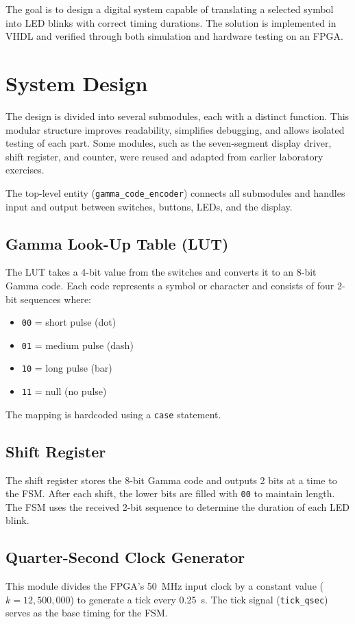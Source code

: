 \documentclass[conference]{IEEEtran}
\begin{document}
The goal is to design a digital system capable of translating a selected symbol into LED blinks with correct timing durations. The solution is implemented in VHDL and verified through both simulation and hardware testing on an FPGA.

\section{System Design}
The design is divided into several submodules, each with a distinct function. This modular structure improves readability, simplifies debugging, and allows isolated testing of each part. Some modules, such as the seven-segment display driver, shift register, and counter, were reused and adapted from earlier laboratory exercises.

The top-level entity (\texttt{gamma\_code\_encoder}) connects all submodules and handles input and output between switches, buttons, LEDs, and the display.

\subsection{Gamma Look-Up Table (LUT)}
The LUT takes a 4-bit value from the switches and converts it to an 8-bit Gamma code. Each code represents a symbol or character and consists of four 2-bit sequences where:
\begin{itemize}
    \item \texttt{00} = short pulse (dot)
    \item \texttt{01} = medium pulse (dash)
    \item \texttt{10} = long pulse (bar)
    \item \texttt{11} = null (no pulse)
\end{itemize}
The mapping is hardcoded using a \texttt{case} statement.

\subsection{Shift Register}
The shift register stores the 8-bit Gamma code and outputs 2 bits at a time to the FSM. After each shift, the lower bits are filled with \texttt{00} to maintain length. The FSM uses the received 2-bit sequence to determine the duration of each LED blink.

\subsection{Quarter-Second Clock Generator}
This module divides the FPGA’s 50~MHz input clock by a constant value ($k = 12{,}500{,}000$) to generate a tick every 0.25~s. The tick signal (\texttt{tick\_qsec}) serves as the base timing for the FSM.
\end{document}
